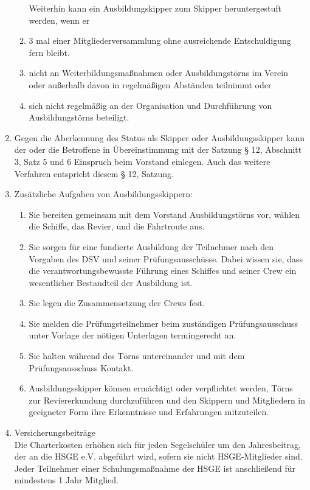 \documentclass[10pt, twocolumn, parskip=half]{scrartcl}
\begin{document}
\begin{enumerate}[noitemsep]
\begin{enumerate}[noitemsep]
		Weiterhin kann ein Ausbildungskipper zum Skipper heruntergestuft werden, wenn er
		\item 3 mal einer Mitgliederversammlung ohne ausreichende Entschuldigung fern bleibt.
		\item nicht an Weiterbildungsmaßnahmen oder Ausbildungstörns im Verein oder außerhalb davon in regelmäßigen Abständen teilnimmt oder
		\item sich nicht regelmäßig an der Organisation und Durchführung von Ausbildungstörns beteiligt.
	\end{enumerate}
	\item Gegen die Aberkennung des Status als Skipper oder Ausbildungsskipper kann der oder die Betroffene in Übereinstimmung mit der Satzung § 12, Abschnitt 3, Satz 5 und 6 Einspruch beim Vorstand einlegen. Auch das weitere Verfahren entspricht diesem § 12, Satzung.
	\item Zusätzliche Aufgaben von Ausbildungsskippern:
	\begin{enumerate}[noitemsep]
		\item Sie bereiten gemeinsam mit dem Vorstand Ausbildungstörns vor, wählen die Schiffe, das Revier, und die Fahrtroute aus.
		\item Sie sorgen für eine fundierte Ausbildung der Teilnehmer nach den Vorgaben des DSV und seiner Prüfungsausschüsse. Dabei wissen sie, dass die verantwortungsbewusste Führung eines Schiffes und seiner Crew ein wesentlicher Bestandteil der Ausbildung ist.
		\item Sie legen die Zusammensetzung der Crews fest.
		\item Sie melden die Prüfungsteilnehmer beim zuständigen Prüfungsausschuss unter Vorlage der nötigen Unterlagen termingerecht an.
		\item Sie halten während des Törns untereinander und mit dem Prüfungsausschuss Kontakt.
		\item Ausbildungsskipper können ermächtigt oder verpflichtet werden, Törns zur Reviererkundung durchzuführen und den Skippern und Mitgliedern in geeigneter Form ihre Erkenntnisse und Erfahrungen mitzuteilen.
	\end{enumerate}
	\item Versicherungsbeiträge\\
	Die Charterkosten erhöhen sich für jeden Segelschüler um den Jahresbeitrag, der an die HSGE e.V. abgeführt wird, sofern sie nicht HSGE-Mitglieder sind. Jeder Teilnehmer einer Schulungsmaßnahme der HSGE ist anschließend für mindestens 1 Jahr Mitglied.
\end{enumerate}
\end{document}
